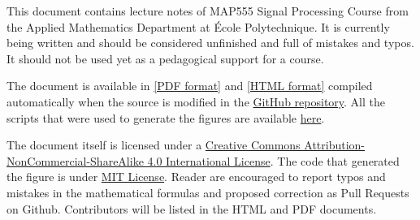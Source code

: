 This document contains lecture notes of MAP555 Signal Processing
Course from the Applied Mathematics Department at École Polytechnique. It is
currently being written and should be considered
unfinished and full of mistakes and typos. It should not be used yet as a
pedagogical support for a course. 

The document is available in \href{https://rflamary.github.io/map555-signal-processing/poly.pdf}{[PDF
format]} and \href{https://rflamary.github.io/map555-signal-processing/}{[HTML
format]} compiled automatically when the source is modified in the \href{https://rflamary.github.io/map555-signal-processing/}{GitHub
repository}. All the scripts that were used to generate the figures are
available \href{https://github.com/rflamary/map555-signal-processing/tree/main/scripts}{here}.

The document itself is licensed under a
\href{http://creativecommons.org/licenses/by-nc-sa/4.0/}{Creative Commons
Attribution-NonCommercial-ShareAlike 4.0 International License}. The code that
generated the figure is under \href{https://opensource.org/licenses/MIT}{MIT License}.
Reader are
encouraged to report typos and mistakes in the mathematical formulas and
proposed correction as Pull Requests on Github. Contributors will be listed in
the HTML and PDF documents.


